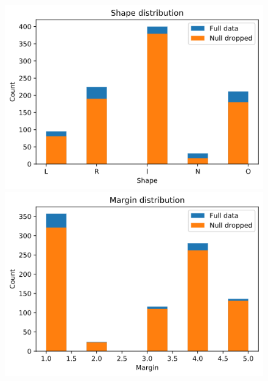\documentclass[11pt,a4paper]{article}
\begin{document}
\begin{figure}[H]
\centering

\begin{minipage}{0.5\textwidth}
    \centering
    \includegraphics[scale=0.35]{img/shape-distribution.png}
\end{minipage}%
\begin{minipage}{0.5\textwidth}
    \centering
    \includegraphics[scale=0.35]{img/margin-distribution.png}
\end{minipage}

\end{figure}
\end{document}
